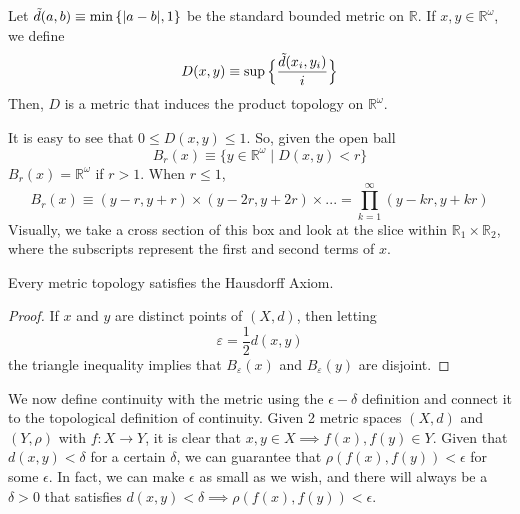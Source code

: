 \documentclass{article}
\begin{document}
  \begin{theorem}
  Let $\Tilde{d} (a, b) \equiv \min{\{|a-b|, 1\}}$ be the standard bounded metric on $\mathbb{R}$. If $x, y \in \mathbb{R}^\omega$, we define
  \[ D(x, y) \equiv \sup{\Big\{ \frac{\Tilde{d}(x_i, y_i)}{i}\Big\}}\]
  Then, $D$ is a metric that induces the product topology on $\mathbb{R}^\omega$. 
  \end{theorem}
  It is easy to see that $0 \leq D(x, y) \leq 1$. So, given the open ball
  \[B_r (x) \equiv \{y \in \mathbb{R}^\omega \; | \; D(x, y) < r\}\]
  $B_r (x) = \mathbb{R}^\omega$ if $r > 1$. When $r \leq 1$, 
  \[B_r (x) \equiv (y-r, y+r) \times (y-2r, y+2r) \times ... = \prod_{k=1}^\infty (y - k r , y + k r)\]
  Visually, we take a cross section of this box and look at the slice within $\mathbb{R}_1 \times \mathbb{R}_2$, where the subscripts represent the first and second terms of $x$. 
  \begin{center}
  \end{center}

  \begin{proposition}
  Every metric topology satisfies the Hausdorff Axiom.
  \end{proposition}
  \begin{proof}
  If $x$ and $y$ are distinct points of $(X, d)$, then letting
  \[\varepsilon = \frac{1}{2} d(x, y)\]
  the triangle inequality implies that $B_\varepsilon (x)$ and $B_\varepsilon (y)$ are disjoint. 
  \end{proof}

  We now define continuity with the metric using the $\epsilon - \delta$ definition and connect it to the topological definition of continuity. Given 2 metric spaces $(X, d)$ and $(Y, \rho)$ with $f: X \longrightarrow Y$, it is clear that $x, y \in X \implies f(x), f(y) \in Y$. Given that $d(x, y) < \delta$ for a certain $\delta$, we can guarantee that $\rho(f(x), f(y)) < \epsilon$ for some $\epsilon$. In fact, we can make $\epsilon$ as small as we wish, and there will always be a $\delta > 0$ that satisfies $d(x, y) < \delta \implies \rho(f(x), f(y)) < \epsilon$.  
\end{document}
